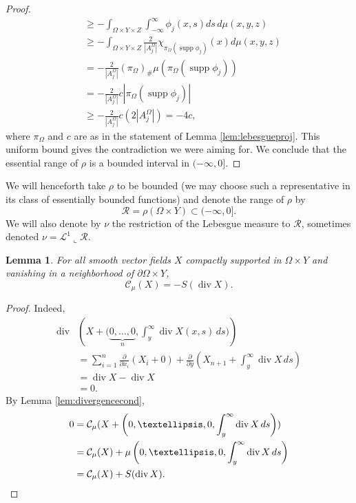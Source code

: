 \documentclass{article}
\newtheorem{lemma}[theorem]{Lemma}
\theoremstyle{definition}
\theoremstyle{remark}
\newcommand{\proj}{\pi}
\newcommand{\projX}{\proj_{\Omega}}
\begin{document}
\begin{proof}
\begin{align*}
    &\geq - \int_{\Omega\times Y\times Z}\int_{-\infty}^\infty\phi_j(x,s)ds\, d\mu(x,y,z)\\
    &\geq -\int_{\Omega\times Y\times Z}
    \frac2{|A^\Omega_j|}%
    \chi_{\projX{}(\operatorname{supp}\phi_j)}(x)d\mu(x,y,z)\\
    &=-\frac2{|A^\Omega_j|}(\projX{})_\#\mu(\projX{}(\operatorname{supp}\phi_j))\\
    &=-\frac2{|A^\Omega_j|}c|\projX{}(\operatorname{supp}\phi_j)|\\
    &\geq -\frac2{|A^\Omega_j|}c(2|A^\Omega_j|)=-4c,
 \end{align*}
 where $\projX{}$ and $c$ are as in the statement of Lemma \ref{lem:lebesgueproj}.
 This uniform bound gives the contradiction we were aiming for. We conclude that the essential range of $\rho$ is a bounded interval in $(-\infty,0]$. 
 \end{proof}
 
 We will henceforth take $\rho$ to be bounded (we may choose such a representative in its class of essentially bounded functions) and denote the range of $\rho$ by
 \[{\mathcal R}=\rho(\Omega\times Y)\subset(-\infty,0].\]
 We will also denote by $\nu$ the restriction of 
{the} Lebesgue measure to ${\mathcal R}$, sometimes denoted $\nu=\mathcal L^1\llcorner\mathcal R$.
%
%
%
%
%
%
%
%
%
%
%

\begin{lemma}\label{lem:dividentity}
For all smooth vector fields $X$ compactly supported in $\Omega\times Y$ and vanishing in a neighborhood of $\partial \Omega\times Y$,
\[{\mathcal C_\mu}(X)=-S(\operatorname{div} X).\]
\end{lemma}
\begin{proof}
Indeed,
\begin{align*}
 \operatorname{div}&(X+\Big(\underbrace{0,\dots,0}_n,\int_y^{\infty} \operatorname{div}X(x,s)\,ds\Big))\\
 &=\sum_{i=1}^n\frac{\partial }{\partial x_i}\left(
  X_i+0
 \right)+\frac{\partial}{\partial y}\left(X_{n+1}+\int_y^\infty\operatorname{div} X\,ds\right)\\
 &=\operatorname{div} X-\operatorname{div} X\\
 &=0.
\end{align*}
By Lemma \ref{lem:divergencecond},
\begin{align*}0&={\mathcal C_\mu}(X+\left(0,\dots,0,\int_y^\infty\operatorname{div}X\,ds\right))\\
&={\mathcal C_\mu}(X)+\mu\left(0,\dots,0,\int_y^\infty\operatorname{div}X\,ds\right)\\
&={\mathcal C_\mu}(X)+S(\operatorname{div}X).\qedhere
\end{align*}
\end{proof}
\end{document}
